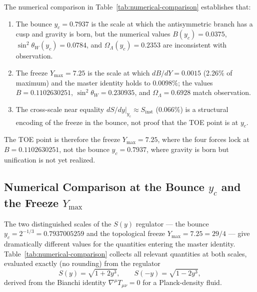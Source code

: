 \documentclass[12pt,oneside,openany]{book}
\begin{document}
The numerical comparison in Table~\ref{tab:numerical-comparison} establishes that:
\begin{enumerate}
\item The bounce $y_c = 0.7937$ is the scale at which the antisymmetric branch has a cusp and gravity is born, but the numerical values $B(y_c) = 0.0375$, $\sin^2\theta_W(y_c) = 0.0784$, and $\Omega_\Lambda(y_c) = 0.2353$ are inconsistent with observation.
\item The freeze $Y_{\max} = 7.25$ is the scale at which $dB/dY = 0.0015$ (2.26\% of maximum) and the master identity holds to $0.0098\%$; the values $B = 0.1102630251$, $\sin^2\theta_W = 0.230935$, and $\Omega_\Lambda = 0.6928$ match observation.
\item The cross-scale near equality $dS/dy|_{y_c} \approx S_{\mathrm{inst}}$ (0.066\%) is a structural encoding of the freeze in the bounce, not proof that the TOE point is at $y_c$.
\end{enumerate}
The TOE point is therefore the freeze $Y_{\max} = 7.25$, where the four forces lock at $B = 0.1102630251$, not the bounce $y_c = 0.7937$, where gravity is born but unification is not yet realized.

\subsection{Numerical Comparison at the Bounce $y_c$ and the Freeze $Y_{\max}$}
\label{sec:numerical-comparison-table}

The two distinguished scales of the $S(y)$ regulator — the bounce $y_c = 2^{-1/3} = 0.7937005259$ and the topological freeze $Y_{\max} = 7.25 = 29/4$ — give dramatically different values for the quantities entering the master identity. Table~\ref{tab:numerical-comparison} collects all relevant quantities at both scales, evaluated exactly (no rounding) from the regulator
\begin{equation}
S(y) = \sqrt{1 + 2y^3}, \qquad S(-y) = \sqrt{1 - 2y^3},
\label{eq:S-regulator-compare}
\end{equation}
derived from the Bianchi identity $\nabla^\mu T_{\mu\nu} = 0$ for a Planck-density fluid.
\end{document}
